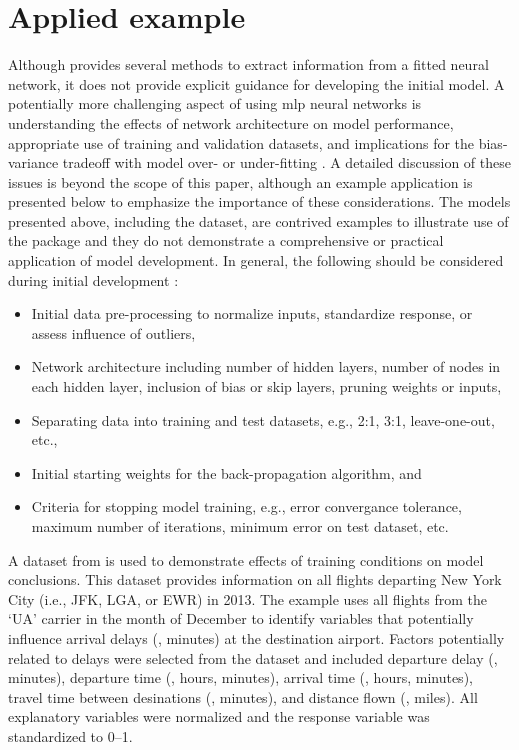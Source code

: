 \documentclass[article,shortnames]{jss}\usepackage[]{graphicx}\usepackage[]{color}
\begin{document}
\section[Applied example]{Applied example}

Although  provides several methods to extract information from a fitted neural network, it does not provide explicit guidance for developing the initial model.  A potentially more challenging aspect of using \ac{mlp} neural networks is understanding the effects of network architecture on model performance, appropriate use of training and validation datasets, and implications for the bias-variance tradeoff with model over- or under-fitting \citep{Maier00}.  A detailed discussion of these issues is beyond the scope of this paper, although an example application is presented below to emphasize the importance of these considerations.  The models presented above, including the  dataset, are contrived examples to illustrate use of the  package and they do not demonstrate a comprehensive or practical application of model development.  In general, the following should be considered during initial development \cite{Ripley96, Lek00, Maier00}:
\begin{itemize}
\item Initial data pre-processing to normalize inputs, standardize response, or assess influence of outliers,
\item Network architecture including number of hidden layers, number of nodes in each hidden layer, inclusion of bias or skip layers, pruning weights or inputs,
\item Separating data into training and test datasets, e.g., 2:1, 3:1, leave-one-out, etc., 
\item Initial starting weights for the back-propagation algorithm, and
\item Criteria for stopping model training, e.g., error convergance tolerance, maximum number of iterations, minimum error on test dataset, etc.
\end{itemize}

A dataset from  \citep{Wickham14b} is used to demonstrate effects of training conditions on model conclusions.  This dataset provides information on all flights departing New York City (i.e., JFK, LGA, or EWR) in 2013.  The example uses all flights from the `UA' carrier in the month of December to identify variables that potentially influence arrival delays (, minutes) at the destination airport.  Factors potentially related to delays were selected from the dataset and included departure delay (, minutes), departure time (, hours, minutes), arrival time (, hours, minutes), travel time between desinations (, minutes), and distance flown (, miles).  All explanatory variables were normalized and the response variable was standardized to 0--1.
\end{document}
